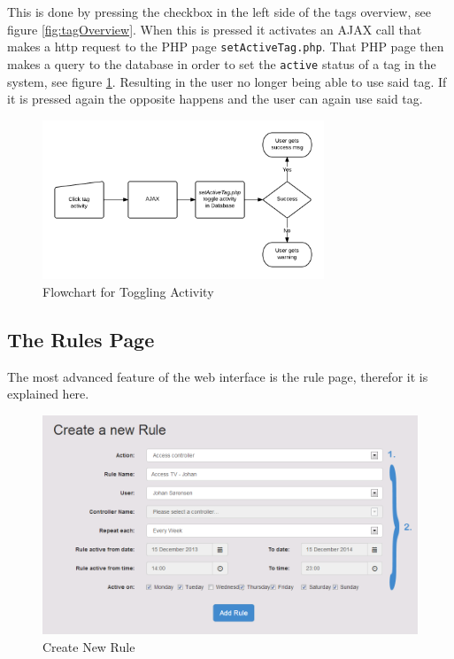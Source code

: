 This is done by pressing the checkbox in the left side of the tags overview, see figure \ref{fig:tagOverview}. When this is pressed it activates an AJAX call that makes a http request to the PHP page \texttt{setActiveTag.php}. That PHP page then makes a query to the database in order to set the \texttt{active} status of a tag in the system, see figure \ref{fig:flowChartTagActivity}. Resulting in the user no longer being able to use said tag. If it is pressed again the opposite happens and the user can again use said tag.


\begin{figure}[htbp]
	\centering
		\includegraphics[width=0.75\textwidth]{images/flowChartTagActivity.png}
	\caption{Flowchart for Toggling Activity}
	\label{fig:flowChartTagActivity}
\end{figure}


\subsection{The Rules Page}
The most advanced feature of the web interface is the rule page, therefor it is explained here.

\begin{figure}[htbp]
	\centering
		\includegraphics[width=1.00\textwidth]{images/createNewRule.png}
	\caption{Create New Rule}
	\label{fig:createNewRule}
\end{figure}

